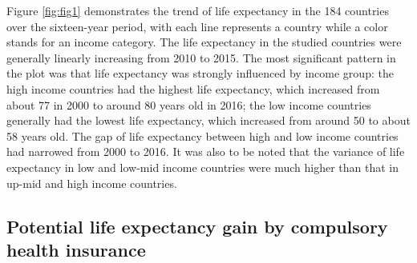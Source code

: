 \documentclass[]{elsarticle} %
\begin{document}
Figure \ref{fig:fig1} demonstrates the trend of life expectancy in the 184 countries over the sixteen-year period, with each line represents a country while a color stands for an income category. The life expectancy in the studied countries were generally linearly increasing from 2010 to 2015. The most significant pattern in the plot was that life expectancy was strongly influenced by income group: the high income countries had the highest life expectancy, which increased from about 77 in 2000 to around 80 years old in 2016; the low income countries generally had the lowest life expectancy, which increased from around 50 to about 58 years old. The gap of life expectancy between high and low income countries had narrowed from 2000 to 2016. It was also to be noted that the variance of life expectancy in low and low-mid income countries were much higher than that in up-mid and high income countries.

\hypertarget{potential-life-expectancy-gain-by-compulsory-health-insurance}{%
\subsection{Potential life expectancy gain by compulsory health insurance}\label{potential-life-expectancy-gain-by-compulsory-health-insurance}}
\end{document}
